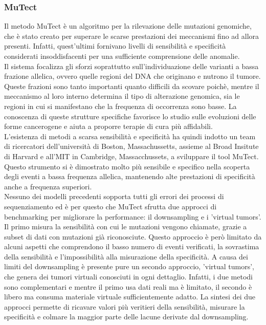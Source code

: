 \subsubsection{MuTect}
Il metodo MuTect è un algoritmo per la rilevazione delle mutazioni genomiche, che è stato creato per superare le scarse prestazioni dei meccanismi fino ad allora presenti. Infatti, quest'ultimi fornivano livelli di sensibilità e specificità considerati insoddisfacenti per una sufficiente comprensione delle anomalie. \\
Il sistema focalizza gli sforzi soprattutto sull'individuazione delle varianti a bassa frazione allelica, ovvero quelle regioni del DNA che originano e nutrono il tumore. Queste frazioni sono tanto importanti quanto difficili da scovare poichè, mentre il meccanismo al loro interno determina il tipo di alterazione genomica, sia le regioni in cui si manifestano che la frequenza di occorrenza sono basse. La conoscenza di queste strutture specifiche favorisce lo studio sulle evoluzioni delle forme cancerogene e aiuta a proporre terapie di cura più affidabili.\\
L'esistenza di metodi a scarsa sensibilità e specificità ha quindi indotto un team di ricercatori dell'università di Boston, Massachussetts, assieme al Broad Insitute di Harvard e all'MIT in Cambridge, Massacchussets, a sviluppare il tool MuTect. Questo strumento si è dimostrato molto più sensibile e specifico nella scoperta degli eventi a bassa frequenza allelica, mantenendo alte prestazioni di specificità anche a frequenza superiori.\\
Nessuno dei modelli precedenti sopporta tutti gli errori dei processi di sequenziamento ed è per questo che MuTect sfrutta due approcci di benchmarking per migliorare la performance: il downsampling e  i 'virtual tumors'. Il primo misura la sensibilità con cui le mutazioni vengono chiamate, grazie a subset di dati con mutazioni già riconosciute. Questo approccio è però limitato da alcuni aspetti che comprendono il basso numero di eventi verificati, la sovrastima della sensibilità e l'impossibilità alla misurazione della specificità. A causa dei limiti del downsampling è presente pure un secondo approccio, 'virtual tumors', che genera dei tumori virtuali conosciuti in ogni dettaglio. Infatti, i due metodi sono complementari e mentre il primo usa dati reali ma è limitato, il secondo è libero ma consuma materiale virtuale sufficientemente adatto. La sintesi dei due approcci permette di ricavare valori più veritieri della  sensibilità, misurare la specificità e colmare la maggior parte delle lacune derivate dal downsampling. \\
